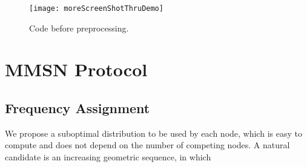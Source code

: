 \documentclass[prodmode,acmtecs]{acmsmall}
\begin{document}

\tableofcontents















\begin{figure}
\centerline{\texttt{[image: moreScreenShotThruDemo]}}
\caption{Code before preprocessing.}
\label{fig:one}
\end{figure}


\section{MMSN Protocol}

\subsection{Frequency Assignment}

We propose a suboptimal distribution to be used by each node, which is
easy to compute and does not depend on the number of competing
nodes. A natural candidate is an increasing geometric sequence, in
which
\end{document}
